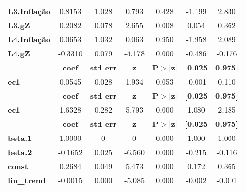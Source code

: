 \begin{center}
\begin{tabular}{lcccccc}
\textbf{L3.Inflação} &       0.8153  &        1.028     &     0.793  &         0.428        &       -1.199    &        2.830     \\
\textbf{L3.gZ}       &       0.2082  &        0.078     &     2.655  &         0.008        &        0.054    &        0.362     \\
\textbf{L4.Inflação} &       0.0653  &        1.032     &     0.063  &         0.950        &       -1.958    &        2.089     \\
\textbf{L4.gZ}       &      -0.3310  &        0.079     &    -4.178  &         0.000        &       -0.486    &       -0.176     \\
             & \textbf{coef} & \textbf{std err} & \textbf{z} & \textbf{P$> |$z$|$} & \textbf{[0.025} & \textbf{0.975]}  \\
\midrule
\textbf{ec1} &       0.0545  &        0.028     &     1.934  &         0.053        &       -0.001    &        0.110     \\
             & \textbf{coef} & \textbf{std err} & \textbf{z} & \textbf{P$> |$z$|$} & \textbf{[0.025} & \textbf{0.975]}  \\
\midrule
\textbf{ec1} &       1.6328  &        0.282     &     5.793  &         0.000        &        1.080    &        2.185     \\
                    & \textbf{coef} & \textbf{std err} & \textbf{z} & \textbf{P$> |$z$|$} & \textbf{[0.025} & \textbf{0.975]}  \\
\midrule
\textbf{beta.1}     &       1.0000  &            0     &         0  &         0.000        &        1.000    &        1.000     \\
\textbf{beta.2}     &      -0.1652  &        0.025     &    -6.560  &         0.000        &       -0.215    &       -0.116     \\
\textbf{const}      &       0.2684  &        0.049     &     5.473  &         0.000        &        0.172    &        0.365     \\
\textbf{lin\_trend} &      -0.0015  &        0.000     &    -5.085  &         0.000        &       -0.002    &       -0.001     \\
\bottomrule
\end{tabular}
\end{center}